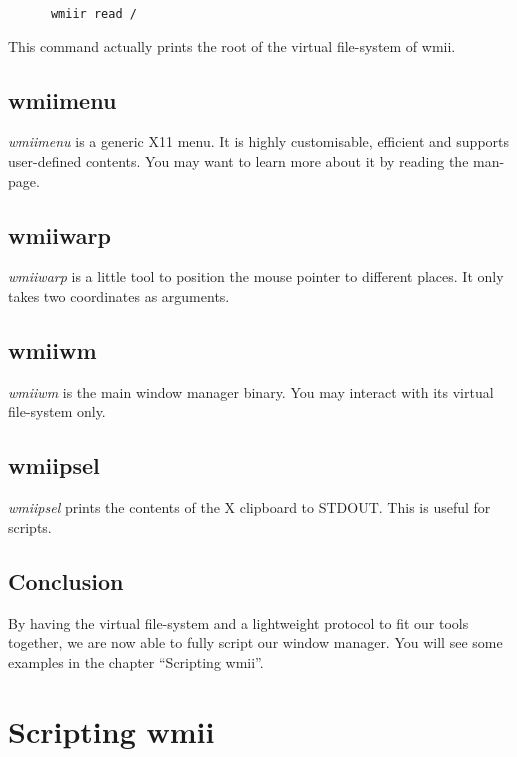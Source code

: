 \documentclass[12pt,a4paper]{article}
\begin{document}
    \begin{verbatim}
      wmiir read /
    \end{verbatim}
    
    This command actually prints the root of the virtual file-system
    of wmii.

  \subsection{wmiimenu}

    \emph{wmiimenu} is a generic X11 menu. It is highly customisable,
    efficient and supports user-defined contents. You may want to
    learn more about it by reading the man-page.

  \subsection{wmiiwarp}

    \emph{wmiiwarp} is a little tool to position the mouse pointer to
    different places. It only takes two coordinates as arguments.

  \subsection{wmiiwm}

    \emph{wmiiwm} is the main window manager binary. You may interact
    with its virtual file-system only.

  \subsection{wmiipsel}

    \emph{wmiipsel} prints the contents of the X clipboard to
    STDOUT. This is useful for scripts.

  \subsection{Conclusion}

    By having the virtual file-system and a lightweight protocol to
    fit our tools together, we are now able to fully script our window
    manager. You will see some examples in the chapter ``Scripting
    wmii''.

\section{Scripting wmii}
\end{document}
